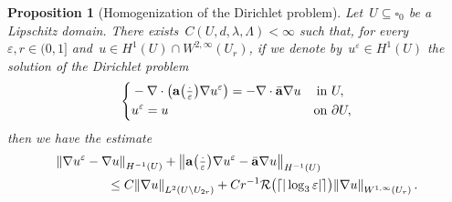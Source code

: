 \documentclass[11pt,twoside]{article} %
\let\oldsquare\square %
\renewcommand{\square}{\oldsquare}
\numberwithin{equation}{section}
\newtheorem{proposition}[theorem]{Proposition}
\theoremstyle{definition}
\let\originalleft\left
\let\originalright\right
\renewcommand{\left}{\mathopen{}\mathclose\bgroup\originalleft}
\renewcommand{\right}{\aftergroup\egroup\originalright}
\newcommand{\eps}{\varepsilon}
\newcommand{\ep}{\eps}
\renewcommand{\a}{\mathbf{a}}
\newcommand{\ahom}{\bar{\a}}
\newcommand{\cu}{\square}
\begin{document}
\begin{proposition}
[Homogenization of the Dirichlet problem]
\label{p.DP}
Let~$U \subseteq \cu_0$ be a Lipschitz domain. 
There exists~$C(U,d,\lambda,\Lambda)<\infty$ such that, for every~$\ep,r \in (0,1]$ and~$u \in H^1(U)\cap W^{2,\infty}(U_{r})$, if we denote by~$u^\ep\in H^1(U)$ the solution of the Dirichlet problem
\begin{equation*}
\left\{
\begin{aligned}
& -\nabla \cdot \left( \a\left(\tfrac \cdot\ep\right) \nabla u^\ep \right) = -\nabla \cdot \ahom \nabla u &  \mbox{in} & \ U, \\
& u^\ep = u & \mbox{on} & \ \partial U,
\end{aligned}
\right.
\end{equation*}
then we have the estimate
\begin{align}
\label{e.DP}
\lefteqn{
\left\| \nabla u^\ep - \nabla  u  \right\|_{H^{-1}(U)}  
+ \left\| \a\left(\tfrac\cdot\ep\right) \nabla u^\ep -\ahom \nabla  u  \right\|_{H^{-1}(U)}
} \qquad\qquad & 
\notag \\ &
\leq 
C \left\| \nabla u \right\|_{L^{2}(U \setminus U_{2r})} 
+
Cr^{-1} \mathcal{R}\bigl( \lceil |\log_3 \ep| \rceil \bigr) \left\|  \nabla u \right\|_{W^{1,\infty}(U_r)}
\,.
\end{align}
\end{proposition}
\end{document}
